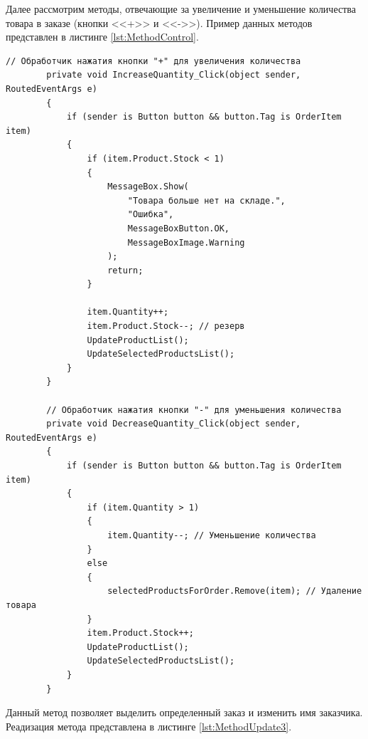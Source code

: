 \documentclass[12pt]{article}
\newcommand{\colorGIT}[1]{\textcolor{CtpGreen}{#1}}
\begin{document}
\pagebreak

Далее рассмотрим методы, отвечающие за увеличение и уменьшение количества
товара в заказе (кнопки <<+>> и <<->>). Пример данных методов представлен в листинге \ref{lst:MethodControl}.


\begin{lstlisting}[style=csharp_catppuccin, caption=\colorGIT{\href{https://github.com/WebMasterIT/Csharp_Labs/blob/ec375afd16c0647b337cf3d8a79c8bef904fc1be/3lab/StoreManager/MainWindow.xaml.cs\#L342-L377}{Методы}} управления количеством товара в заказе, label=lst:MethodControl]
        // Обработчик нажатия кнопки "+" для увеличения количества
        private void IncreaseQuantity_Click(object sender, RoutedEventArgs e)
        {
            if (sender is Button button && button.Tag is OrderItem item)
            {
                if (item.Product.Stock < 1)
                {
                    MessageBox.Show(
                        "Товара больше нет на складе.",
                        "Ошибка",
                        MessageBoxButton.OK,
                        MessageBoxImage.Warning
                    );
                    return;
                }

                item.Quantity++;
                item.Product.Stock--; // резерв
                UpdateProductList();
                UpdateSelectedProductsList();
            }
        }

        // Обработчик нажатия кнопки "-" для уменьшения количества
        private void DecreaseQuantity_Click(object sender, RoutedEventArgs e)
        {
            if (sender is Button button && button.Tag is OrderItem item)
            {
                if (item.Quantity > 1)
                {
                    item.Quantity--; // Уменьшение количества
                }
                else
                {
                    selectedProductsForOrder.Remove(item); // Удаление товара
                }
                item.Product.Stock++;
                UpdateProductList();
                UpdateSelectedProductsList();
            }
        }
\end{lstlisting}

\newpage

Данный метод позволяет выделить определенный заказ и изменить имя заказчика.
Реадизация метода представлена в листинге \ref{lst:MethodUpdate3}.
\end{document}
